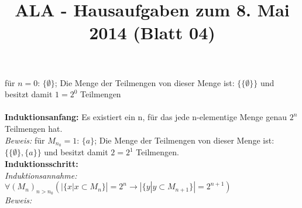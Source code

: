 \documentclass[fleqn]{article}
\title{ALA - Hausaufgaben zum 8. Mai 2014 (Blatt 04)}
\author{}
\date{\gertoday}
\begin{document}
\maketitle

\section{}
für $n = 0$: $\{\emptyset\}$; Die Menge der Teilmengen von dieser Menge ist: $\{\{\emptyset\}\}$ und besitzt damit $1 = 2^0$ Teilmengen\\ \\

\textbf{Induktionsanfang:} Es existiert ein n, für das jede n-elementige Menge genau $2^n$ Teilmengen hat.\\
\emph{Beweis:} für $M_{n_0} = 1$: $\{a\}$; Die Menge der Teilmengen von dieser Menge ist: $\{\{\emptyset\},\{a\}\}$ und besitzt damit $2 = 2^1$ Teilmengen.\\
\textbf{Induktionsschritt:}\\
\emph{Induktionsannahme:} $\forall (M_n)_{n>n_0} (|\{x|x \subset M_n\}|  = 2^n \rightarrow |\{y|y \subset M_{n+1}\}| = 2^{n+1})$\\
\emph{Beweis:}
\begin{flalign}
    |M_n| = \sum\limits_{i = 1}^{n} = (\matrix{n##i)
\end{flalign}
\end{document}
